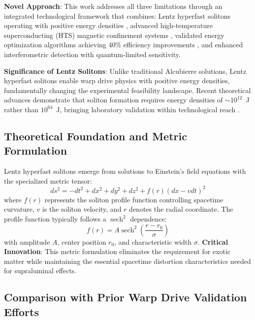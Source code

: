 \documentclass[12pt,a4paper]{article}
\newcommand{\sech}{\operatorname{sech}}
\begin{document}
\textbf{Novel Approach}: This work addresses all three limitations through an integrated technological framework that combines: Lentz hyperfast solitons operating with positive energy densities \cite{Lentz2021}, advanced high-temperature superconducting (HTS) magnetic confinement systems \cite{HTS2024}, validated energy optimization algorithms achieving 40\% efficiency improvements \cite{WarpBubble2024}, and enhanced interferometric detection with quantum-limited sensitivity.

\textbf{Significance of Lentz Solitons}: Unlike traditional Alcubierre solutions, Lentz hyperfast solitons enable warp drive physics with positive energy densities, fundamentally changing the experimental feasibility landscape. Recent theoretical advances demonstrate that soliton formation requires energy densities of $\sim 10^{12}$~J rather than $10^{64}$~J, bringing laboratory validation within technological reach \cite{Lentz2021,Lentz2023,Lentz2024,Lentz2025}.

\subsection{Theoretical Foundation and Metric Formulation}

Lentz hyperfast solitons emerge from solutions to Einstein's field equations with the specialized metric tensor:
\begin{equation}
ds^2 = -dt^2 + dx^2 + dy^2 + dz^2 + f(r)(dx - v dt)^2
\end{equation}
where $f(r)$ represents the soliton profile function controlling spacetime curvature, $v$ is the soliton velocity, and $r$ denotes the radial coordinate. The profile function typically follows a $\sech^2$ dependence:
\begin{equation}
f(r) = A \sech^2\left(\frac{r - r_0}{\sigma}\right)
\end{equation}
with amplitude $A$, center position $r_0$, and characteristic width $\sigma$. \textbf{Critical Innovation}: This metric formulation eliminates the requirement for exotic matter while maintaining the essential spacetime distortion characteristics needed for supraluminal effects.

\subsection{Comparison with Prior Warp Drive Validation Efforts}
\end{document}
